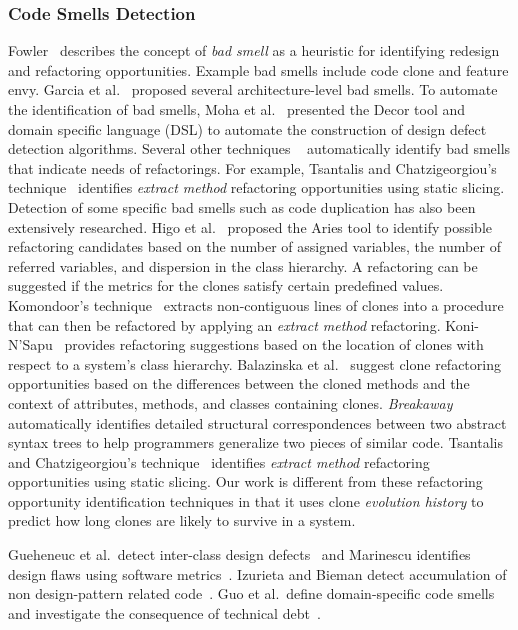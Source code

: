 \documentclass[runningheads,a4paper]{llncs}
\begin{document}
\subsubsection{Code Smells Detection} 

Fowler~\cite{fowler:refactor99} describes the concept of {\em bad smell} as a heuristic for identifying redesign and refactoring opportunities. Example bad smells include code clone and feature envy. Garcia et al.~\cite{garcia:csmr09} proposed several architecture-level bad smells. To automate the identification of bad smells, Moha et al.~\cite{moha:fase08} presented the Decor tool and domain specific language (DSL) to automate the construction of design defect detection algorithms.  Several other techniques ~\cite{tsantalis:csmr09, tsantalis:tse09, tsantalis:csmr08} automatically identify bad smells that indicate needs of refactorings. For example, Tsantalis and Chatzigeorgiou's technique~\cite{tsantalis:csmr09} identifies {\em extract method} refactoring opportunities using static slicing. Detection of some specific bad smells such as code duplication has also been extensively researched. Higo et al.~\cite{higo:profes04} proposed the Aries tool to identify possible refactoring candidates based on the number of assigned variables, the number of referred variables, and dispersion in the class hierarchy. A refactoring can be suggested if the metrics for the clones satisfy certain predefined values. Komondoor's technique~\cite{Komondoor2003} extracts non-contiguous lines of clones into a procedure that can then be refactored by applying an {\em extract method} refactoring. Koni-N'Sapu~\cite{KONI01} provides refactoring suggestions based on the location of clones with respect to a system's class hierarchy. Balazinska et al.~\cite{Balazinska2000} suggest clone refactoring opportunities based on the differences between the cloned methods and the context of attributes, methods, and classes containing clones. {\it Breakaway} \cite{Cottrell2007} automatically identifies detailed structural correspondences between two abstract syntax trees to help programmers generalize two pieces of similar code. Tsantalis and Chatzigeorgiou's technique~\cite{Tsantalis2009:extractmethod,Tsantalis2008:jdeodorant} identifies {\em extract method} refactoring opportunities using static slicing. Our work is different from these refactoring opportunity identification techniques in that it uses clone {\em evolution history} to predict how long clones are likely to survive in a system. 

Gueheneuc et al.~detect inter-class design defects~\cite{Gueheneuc2001:designdefect} and Marinescu identifies design flaws using software metrics~\cite{Marinescu2004:designflaw}. Izurieta and Bieman detect accumulation of non design-pattern related code~\cite{Izurieta2007:grime}. Guo et al.~define domain-specific code smells~\cite{Guo2010:smell} and investigate the consequence of technical debt~\cite{Guo2011:td}.
\end{document}
